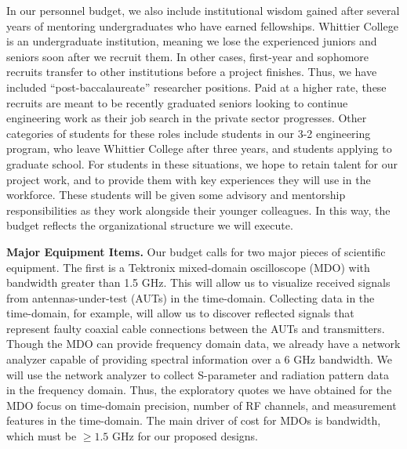 \documentclass[10pt]{amsart}
\theoremstyle{definition}
\numberwithin{equation}{section}
\begin{document}
In our personnel budget, we also include institutional wisdom gained after several years of mentoring undergraduates who have earned fellowships.  Whittier College is an undergraduate institution, meaning we lose the experienced juniors and seniors soon after we recruit them.  In other cases, first-year and sophomore recruits transfer to other institutions before a project finishes.  Thus, we have included ``post-baccalaureate'' researcher positions.  Paid at a higher rate, these recruits are meant to be recently graduated seniors looking to continue engineering work as their job search in the private sector progresses.  Other categories of students for these roles include students in our 3-2 engineering program, who leave Whittier College after three years, and students applying to graduate school. For students in these situations, we hope to retain talent for our project work, and to provide them with key experiences they will use in the workforce.  These students will be given some advisory and mentorship responsibilities as they work alongside their younger colleagues.  In this way, the budget reflects the organizational structure we will execute. 

\textbf{Major Equipment Items.} Our budget calls for two major pieces of scientific equipment.  The first is a Tektronix mixed-domain oscilloscope (MDO) with bandwidth greater than 1.5 GHz.  This will allow us to visualize received signals from antennas-under-test (AUTs) in the time-domain.  Collecting data in the time-domain, for example, will allow us to discover reflected signals that represent faulty coaxial cable connections between the AUTs and transmitters.  Though the MDO can provide frequency domain data, we already have a network analyzer capable of providing spectral information over a 6 GHz bandwidth.  We will use the network analyzer to collect S-parameter and radiation pattern data in the frequency domain.  Thus, the exploratory quotes we have obtained for the MDO focus on time-domain precision, number of RF channels, and measurement features in the time-domain.  The main driver of cost for MDOs is bandwidth, which must be $\geq 1.5$ GHz for our proposed designs. 
\end{document}
